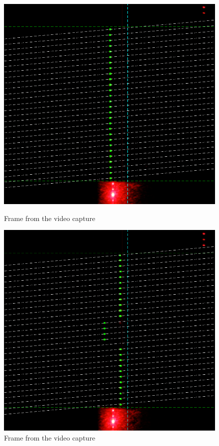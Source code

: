 \begin{figure}[H]
    \centering
    \begin{minipage}[t]{0.48\textwidth}
        \centering
        \includegraphics[width=1.0\textwidth]{figures/reconstruction/crossepilines1_crop.png}
        \caption{Frame from the video capture }
    \label{fig:crossepilines1}
    \end{minipage}%
    \hspace{.03\textwidth}
    \begin{minipage}[t]{0.48\textwidth}
        \centering
        \includegraphics[width=1.0\textwidth]{figures/reconstruction/crossepilines2_crop.png}
        \caption{Frame from the video capture }
        \label{fig:crossepilines2}
    \end{minipage}
\end{figure}
